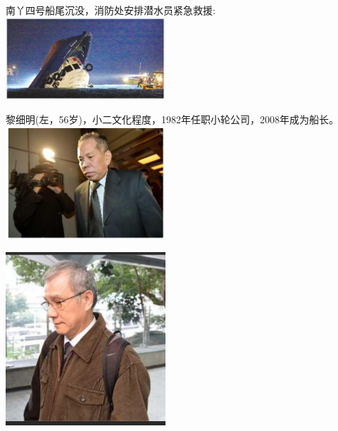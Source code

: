
南丫四号船尾沉没，消防处安排潜水员紧急救援:\\

\includegraphics[width=6cm]{LammaAccidentScreenshot_2023-06-01_194248.jpg}

黎细明(左，56岁)，小二文化程度，1982年任职小轮公司，2008年成为船长。\\

\includegraphics[width=6cm]{CaptainScreenshot_2023-06-01_195518.jpg}


\includegraphics[width=6cm]{Captain2Screenshot_2023-06-01_195805.jpg}


